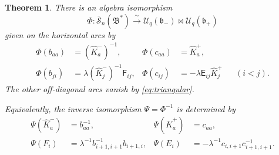 \documentclass[11pt]{amsart}
\newtheorem{theorem}{Theorem}[section]
\theoremstyle{remark}
\newcommand{\UU}{\mathcal U_q}
\newcommand{\rSk}{\overline{\mathscr S}_n}
\newcommand{\Bstar}{\mathfrak B^{*}}
\newcommand{\bplus}{\mathfrak b_+}
\newcommand{\bminus}{\mathfrak b_-}
\begin{document}
\begin{theorem}\label{thm:main}
There is an algebra isomorphism
\[
 \Phi:\rSk(\Bstar)\xrightarrow{\ \sim\ }
       \UU(\bminus)\bowtie\UU(\bplus)
\]
given on the horizontal arcs by
\begin{align}
 \Phi(b_{aa})&=(\widehat K_a^-)^{-1},
 &
 \Phi(c_{aa})&=\widehat K_a^+,
 \label{eq:Phi-diagonal}\\
 \Phi(b_{ji})&=\lambda(\widehat K_j^-)^{-1}\mathsf F_{ij},
 &
 \Phi(c_{ij})&=-\lambda\mathsf E_{ij}\widehat K_j^+
       &&(i<j).
 \label{eq:Phi-offdiagonal}
\end{align}
The other off-diagonal arcs vanish by
\eqref{eq:triangular}.

Equivalently, the inverse isomorphism $\Psi=\Phi^{-1}$ is
determined by
\begin{align}
 \Psi(\widehat K_a^-)&=b_{aa}^{-1},
 &
 \Psi(\widehat K_a^+)&=c_{aa},
 \label{eq:Psi-tori}\\
 \Psi(F_i)&=\lambda^{-1}b_{i+1,i+1}^{-1}b_{i+1,i},
 &
 \Psi(E_i)&=-\lambda^{-1}c_{i,i+1}c_{i+1,i+1}^{-1}.
 \label{eq:Psi-EF}
\end{align}
\end{theorem}
\end{document}
